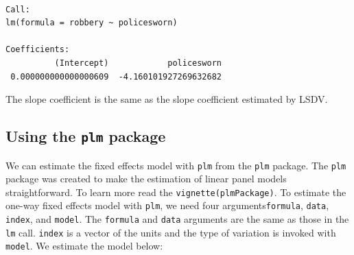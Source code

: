 \documentclass[]{book}
\newenvironment{Shaded}{\begin{snugshade}}{\end{snugshade}}
\newcommand{\CommentTok}[1]{\textcolor[rgb]{0.56,0.35,0.01}{\textit{#1}}}
\newcommand{\DataTypeTok}[1]{\textcolor[rgb]{0.13,0.29,0.53}{#1}}
\newcommand{\DecValTok}[1]{\textcolor[rgb]{0.00,0.00,0.81}{#1}}
\newcommand{\KeywordTok}[1]{\textcolor[rgb]{0.13,0.29,0.53}{\textbf{#1}}}
\newcommand{\NormalTok}[1]{#1}
\newcommand{\OperatorTok}[1]{\textcolor[rgb]{0.81,0.36,0.00}{\textbf{#1}}}
\newcommand{\StringTok}[1]{\textcolor[rgb]{0.31,0.60,0.02}{#1}}
\begin{document}
\begin{verbatim}

Call:
lm(formula = robbery ~ policesworn)

Coefficients:
          (Intercept)            policesworn  
 0.000000000000000609  -4.160101927269632682  
\end{verbatim}

The slope coefficient is the same as the slope coefficient estimated by LSDV.

\hypertarget{using-the-plm-package}{%
\subsection{\texorpdfstring{Using the \texttt{plm} package}{Using the plm package}}\label{using-the-plm-package}}

We can estimate the fixed effects model with \texttt{plm} from the \texttt{plm} package. The \texttt{plm} package was created to make the estimation of linear panel models straightforward. To learn more read the \texttt{vignette(plmPackage)}. To estimate the one-way fixed effects model with \texttt{plm}, we need four arguments\texttt{formula}, \texttt{data}, \texttt{index}, and \texttt{model}. The \texttt{formula} and \texttt{data} arguments are the same as those in the \texttt{lm} call. \texttt{index} is a vector of the units and the type of variation is invoked with \texttt{model}. We estimate the model below:

\begin{Shaded}
\end{Shaded}
\end{document}
